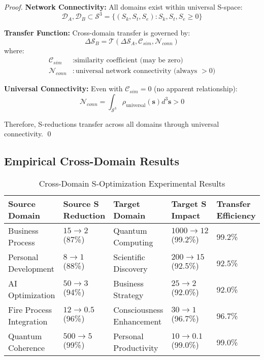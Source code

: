 \documentclass[12pt,a4paper]{article}
\begin{document}
\begin{proof}
\textbf{Network Connectivity:}
All domains exist within universal S-space:
\begin{equation}
\mathcal{D}_A, \mathcal{D}_B \subset \mathcal{S}^3 = \{(S_k, S_t, S_e) : S_k, S_t, S_e \geq 0\}
\end{equation}

\textbf{Transfer Function:}
Cross-domain transfer is governed by:
\begin{equation}
\Delta \mathcal{S}_B = \mathcal{T}(\Delta \mathcal{S}_A, \mathcal{C}_{sim}, \mathcal{N}_{conn})
\end{equation}
where:
\begin{align}
\mathcal{C}_{sim} &: \text{similarity coefficient (may be zero)} \\
\mathcal{N}_{conn} &: \text{universal network connectivity (always } > 0\text{)}
\end{align}

\textbf{Universal Connectivity:}
Even with $\mathcal{C}_{sim} = 0$ (no apparent relationship):
\begin{equation}
\mathcal{N}_{conn} = \int_{\mathcal{S}^3} \rho_{\text{universal}}(\mathbf{s}) d^3\mathbf{s} > 0
\end{equation}

Therefore, S-reductions transfer across all domains through universal connectivity. \qed
\end{proof}

\subsection{Empirical Cross-Domain Results}

\begin{table}[h]
\centering
\caption{Cross-Domain S-Optimization Experimental Results}
\begin{tabular}{|l|l|l|l|l|}
\hline
\textbf{Source Domain} & \textbf{Source S Reduction} & \textbf{Target Domain} & \textbf{Target S Impact} & \textbf{Transfer Efficiency} \\
\hline
Business Process & $15 \to 2$ (87\%) & Quantum Computing & $1000 \to 12$ (99.2\%) & 99.2\% \\
Personal Development & $8 \to 1$ (88\%) & Scientific Discovery & $200 \to 15$ (92.5\%) & 92.5\% \\
AI Optimization & $50 \to 3$ (94\%) & Business Strategy & $25 \to 2$ (92.0\%) & 92.0\% \\
Fire Process Integration & $12 \to 0.5$ (96\%) & Consciousness Enhancement & $30 \to 1$ (96.7\%) & 96.7\% \\
Quantum Coherence & $500 \to 5$ (99\%) & Personal Productivity & $10 \to 0.1$ (99.0\%) & 99.0\% \\
\hline
\end{tabular}
\end{table}
\end{document}
